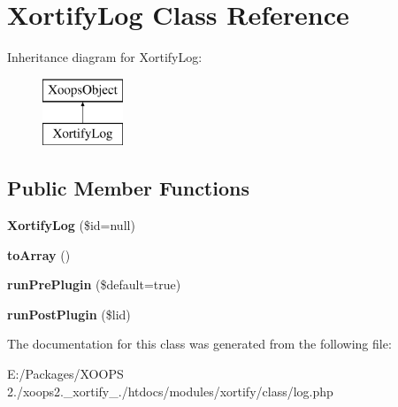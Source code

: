 \hypertarget{class_xortify_log}{\section{Xortify\-Log Class Reference}
\label{class_xortify_log}
}
Inheritance diagram for Xortify\-Log\-:\begin{figure}[H]
\begin{center}
\leavevmode
\includegraphics[height=2.000000cm]{class_xortify_log}
\end{center}
\end{figure}
\subsection*{Public Member Functions}
\begin{DoxyCompactItemize}
\item 
\hypertarget{class_xortify_log_a0b4ac901531d2303b872a98b0b440906}{{\bfseries Xortify\-Log} (\$id=null)}\label{class_xortify_log_a0b4ac901531d2303b872a98b0b440906}

\item 
\hypertarget{class_xortify_log_a62e109ed60526a6fdf9100c22a47b157}{{\bfseries to\-Array} ()}\label{class_xortify_log_a62e109ed60526a6fdf9100c22a47b157}

\item 
\hypertarget{class_xortify_log_aa4429a8e79fa748a036492be4d2cf82c}{{\bfseries run\-Pre\-Plugin} (\$default=true)}\label{class_xortify_log_aa4429a8e79fa748a036492be4d2cf82c}

\item 
\hypertarget{class_xortify_log_a5dfd04bcc47a20b84ad5e7ed04db58e5}{{\bfseries run\-Post\-Plugin} (\$lid)}\label{class_xortify_log_a5dfd04bcc47a20b84ad5e7ed04db58e5}

\end{DoxyCompactItemize}


The documentation for this class was generated from the following file\-:\begin{DoxyCompactItemize}
\item 
E\-:/\-Packages/\-X\-O\-O\-P\-S 2./xoops2.\-\_\-xortify\-\_./htdocs/modules/xortify/class/log.\-php\end{DoxyCompactItemize}
